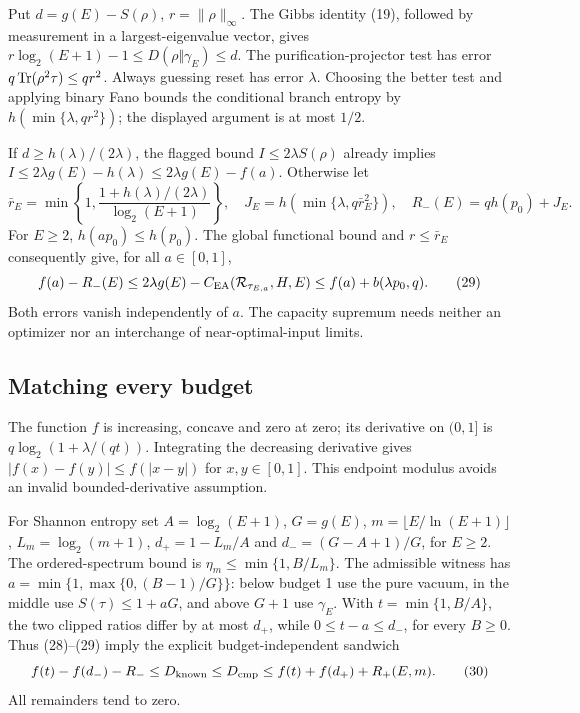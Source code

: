 Put \(d=g(E)-S(\rho)\), \(r=\|\rho\|_\infty\).
The Gibbs identity (19), followed by measurement in a largest-eigenvalue
vector, gives
\(r\log_2(E+1)-1\le D(\rho\Vert\gamma_E)\le d\).
The purification-projector test has error
\(q\operatorname{Tr}(\rho^2\tau)\le qr^2\).
Always guessing reset has error \(\lambda\). Choosing the better test and
applying binary Fano bounds the conditional branch entropy by
\(h(\min\{\lambda,qr^2\})\); the displayed argument is at most \(1/2\).

If \(d\ge h(\lambda)/(2\lambda)\), the flagged bound
\(I\le2\lambda S(\rho)\) already implies
\(I\le2\lambda g(E)-h(\lambda)\le2\lambda g(E)-f(a)\).
Otherwise let
\[
 \bar r_E=\min\left\{1,
       \frac{1+h(\lambda)/(2\lambda)}{\log_2(E+1)}\right\},\quad
 J_E=h(\min\{\lambda,q\bar r_E^2\}),\quad
 R_-(E)=q h(p_0)+J_E .
\]
For \(E\ge2\), \(h(ap_0)\le h(p_0)\). The global functional bound and
\(r\le\bar r_E\) consequently give, for all \(a\in[0,1]\),
\[
 f(a)-R_-(E)\le
 2\lambda g(E)-C_{\mathrm{EA}}(\mathcal R_{\tau_{E,a}},H,E)
 \le f(a)+b(\lambda p_0,q).                                  \tag{29}
\]
Both errors vanish independently of \(a\). The capacity supremum needs
neither an optimizer nor an interchange of near-optimal-input limits.

\subsection{Matching every budget}
The function \(f\) is increasing, concave and zero at zero; its derivative
on \((0,1]\) is \(q\log_2(1+\lambda/(qt))\).
Integrating the decreasing derivative gives
\( |f(x)-f(y)|\le f(|x-y|)\) for \(x,y\in[0,1]\).
This endpoint modulus avoids an invalid bounded-derivative assumption.

For Shannon entropy set \(A=\log_2(E+1)\), \(G=g(E)\),
\(m=\lfloor E/\ln(E+1)\rfloor\), \(L_m=\log_2(m+1)\),
\(d_+=1-L_m/A\) and \(d_-=(G-A+1)/G\), for \(E\ge2\).
The ordered-spectrum bound is \(\eta_m\le\min\{1,B/L_m\}\).
The admissible witness has
\(a=\min\{1,\max\{0,(B-1)/G\}\}\): below budget 1 use the pure vacuum,
in the middle use \(S(\tau)\le1+aG\), and above \(G+1\) use \(\gamma_E\).
With \(t=\min\{1,B/A\}\), the two clipped ratios differ by at most
\(d_+\), while \(0\le t-a\le d_-\), for every \(B\ge0\).
Thus (28)--(29) imply the explicit budget-independent sandwich
\[
 f(t)-f(d_-)-R_-\le D_{\rm known}\le D_{\mathrm{cmp}}
       \le f(t)+f(d_+)+R_+(E,m).                              \tag{30}
\]
All remainders tend to zero.

